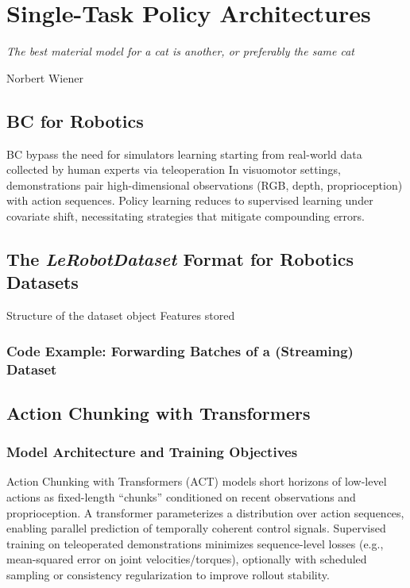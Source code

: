 \section{Single-Task Policy Architectures}
\label{sec:single}

\epigraph{\emph{The best material model for a cat is another, or preferably the same cat}}{Norbert Wiener}


\subsection{BC for Robotics}
BC bypass the need for simulators learning starting from real-world data collected by human experts via teleoperation
In visuomotor settings, demonstrations pair high-dimensional observations (RGB, depth, proprioception) with action sequences. 
Policy learning reduces to supervised learning under covariate shift, necessitating strategies that mitigate compounding errors.

\subsection{The \textit{LeRobotDataset} Format for Robotics Datasets}
Structure of the dataset object
Features stored

\subsubsection{Code Example: Forwarding Batches of a (Streaming) Dataset}

\subsection{Action Chunking with Transformers}
\subsubsection{Model Architecture and Training Objectives}
Action Chunking with Transformers (ACT) models short horizons of low-level actions as fixed-length ``chunks'' conditioned on recent observations and proprioception. A transformer parameterizes a distribution over action sequences, enabling parallel prediction of temporally coherent control signals. Supervised training on teleoperated demonstrations minimizes sequence-level losses (e.g., mean-squared error on joint velocities/torques), optionally with scheduled sampling or consistency regularization to improve rollout stability.

